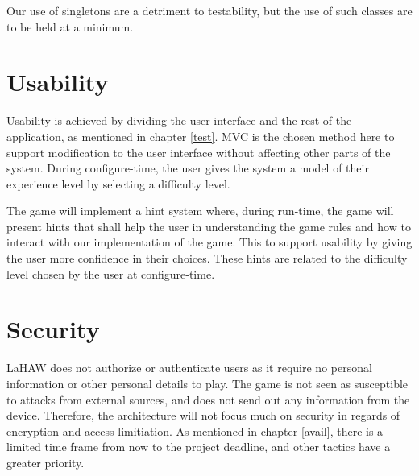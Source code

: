     Our use of singletons are a detriment to testability, but the use of such classes are to be held at a minimum.
    
    \section{Usability}
    Usability is achieved by dividing the user interface and the rest of the application, as mentioned in chapter \ref{test}. MVC is the chosen method here to support modification to the user interface without affecting other parts of the system. During configure-time, the user gives the system a model of their experience level by selecting a difficulty level.
    
    The game will implement a hint system where, during run-time, the game will present hints that shall help the user in understanding the game rules and how to interact with our implementation of the game. This to support usability by giving the user more confidence in their choices.  These hints are related to the difficulty level chosen by the user at configure-time.
    
    \section{Security}
    LaHAW does not authorize or authenticate users as it require no personal information or other personal details to play. The game is not seen as susceptible to attacks from external sources, and does not send out any information from the device. Therefore, the architecture will not focus much on security in regards of encryption and access limitiation. As mentioned in chapter \ref{avail}, there is a limited time frame from now to the project deadline, and other tactics have a greater priority.